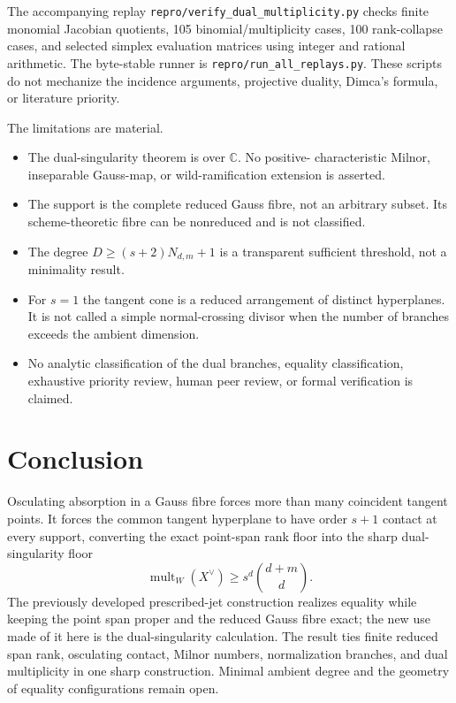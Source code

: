 \documentclass[11pt,a4paper]{article}
\theoremstyle{definition}
\newcommand{\mult}{\operatorname{mult}}
\begin{document}
The accompanying replay
\texttt{repro/verify\_dual\_multiplicity.py} checks finite monomial Jacobian
quotients, 105 binomial/multiplicity cases, 100 rank-collapse cases, and
selected simplex evaluation matrices using integer and rational arithmetic.
The byte-stable runner is
\texttt{repro/run\_all\_replays.py}.  These scripts do not mechanize the
incidence arguments, projective duality, Dimca's formula, or literature
priority.

The limitations are material.
\begin{itemize}
\item The dual-singularity theorem is over $\mathbb C$.  No positive-
characteristic Milnor, inseparable Gauss-map, or wild-ramification extension
is asserted.
\item The support is the complete reduced Gauss fibre, not an arbitrary
subset.  Its scheme-theoretic fibre can be nonreduced and is not classified.
\item The degree $D\geq(s+2)N_{d,m}+1$ is a transparent sufficient threshold,
not a minimality result.
\item For $s=1$ the tangent cone is a reduced arrangement of distinct
hyperplanes.  It is not called a simple normal-crossing divisor when the
number of branches exceeds the ambient dimension.
\item No analytic classification of the dual branches, equality
classification, exhaustive priority review, human peer review, or formal
verification is claimed.
\end{itemize}

\section{Conclusion}

Osculating absorption in a Gauss fibre forces more than many coincident
tangent points.  It forces the common tangent hyperplane to have order
$s+1$ contact at every support, converting the exact point-span rank floor
into the sharp dual-singularity floor
\[
 \mult_W(X^\vee)\geq s^d\binom{d+m}{d}.
\]
The previously developed prescribed-jet construction realizes equality while
keeping the point span proper and the reduced Gauss fibre exact; the new use
made of it here is the dual-singularity calculation.  The result ties finite
reduced span rank,
osculating contact, Milnor numbers, normalization branches, and dual
multiplicity in one sharp construction.  Minimal ambient degree and the
geometry of equality configurations remain open.
\end{document}
